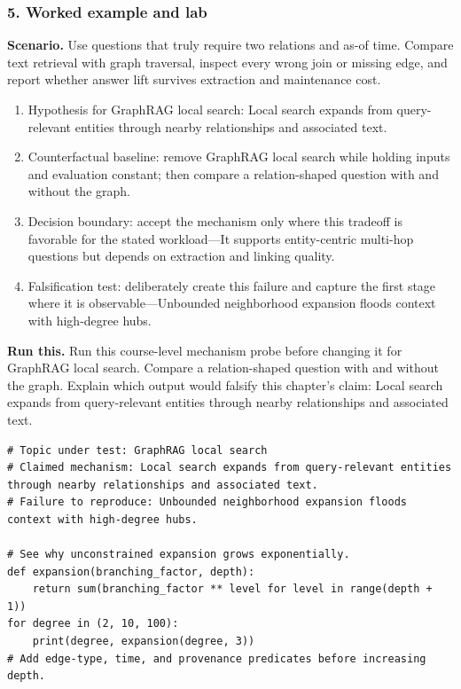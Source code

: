 \subsubsection*{5. Worked example and lab}
\textbf{Scenario.} Use questions that truly require two relations and as-of time. Compare text retrieval with graph traversal, inspect every wrong join or missing edge, and report whether answer lift survives extraction and maintenance cost.
\begin{enumerate}
\item Hypothesis for GraphRAG local search: Local search expands from query-relevant entities through nearby relationships and associated text.
\item Counterfactual baseline: remove GraphRAG local search while holding inputs and evaluation constant; then compare a relation-shaped question with and without the graph.
\item Decision boundary: accept the mechanism only where this tradeoff is favorable for the stated workload—It supports entity-centric multi-hop questions but depends on extraction and linking quality.
\item Falsification test: deliberately create this failure and capture the first stage where it is observable—Unbounded neighborhood expansion floods context with high-degree hubs.
\end{enumerate}
\textbf{Run this.} Run this course-level mechanism probe before changing it for GraphRAG local search. Compare a relation-shaped question with and without the graph. Explain which output would falsify this chapter's claim: Local search expands from query-relevant entities through nearby relationships and associated text.
\begin{Verbatim}[fontsize=\scriptsize]
# Topic under test: GraphRAG local search
# Claimed mechanism: Local search expands from query-relevant entities through nearby relationships and associated text.
# Failure to reproduce: Unbounded neighborhood expansion floods context with high-degree hubs.

# See why unconstrained expansion grows exponentially.
def expansion(branching_factor, depth):
    return sum(branching_factor ** level for level in range(depth + 1))
for degree in (2, 10, 100):
    print(degree, expansion(degree, 3))
# Add edge-type, time, and provenance predicates before increasing depth.
\end{Verbatim}
